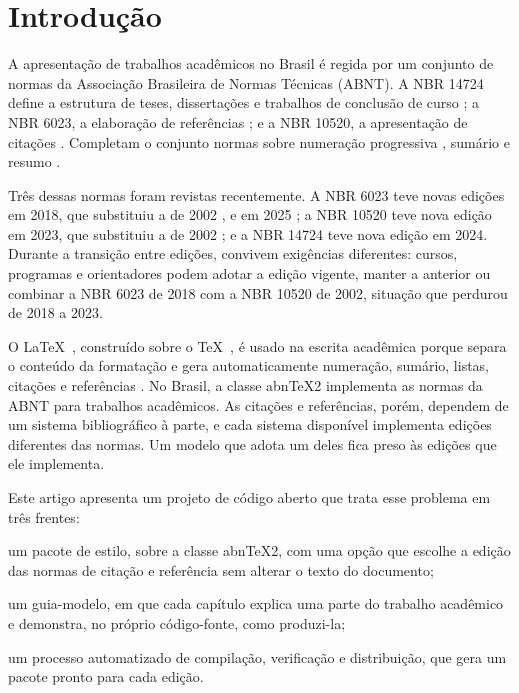 \documentclass[
	article,
	12pt,
	oneside,
	a4paper,
	english,
	brazil,
]{abntex2}
\begin{document}
\frenchspacing
\maketitle

\textual

\section{Introdução}\label{sec:introducao}

A apresentação de trabalhos acadêmicos no Brasil é regida por um conjunto de normas da Associação Brasileira de Normas Técnicas (ABNT). A NBR 14724 define a estrutura de teses, dissertações e trabalhos de conclusão de curso \cite{abnt14724}; a NBR 6023, a elaboração de referências \cite{abnt6023}; e a NBR 10520, a apresentação de citações \cite{abnt10520}. Completam o conjunto normas sobre numeração progressiva \cite{abnt6024}, sumário \cite{abnt6027} e resumo \cite{abnt6028}.

Três dessas normas foram revistas recentemente. A NBR 6023 teve novas edições em 2018, que substituiu a de 2002 \cite{abnt6023-2002}, e em 2025 \cite{abnt6023-2025}; a NBR 10520 teve nova edição em 2023, que substituiu a de 2002 \cite{abnt10520-2002}; e a NBR 14724 teve nova edição em 2024. Durante a transição entre edições, convivem exigências diferentes: cursos, programas e orientadores podem adotar a edição vigente, manter a anterior ou combinar a NBR 6023 de 2018 com a NBR 10520 de 2002, situação que perdurou de 2018 a 2023.

O \LaTeX\ \cite{lamport1994}, construído sobre o \TeX\ \cite{knuth1984texbook}, é usado na escrita acadêmica porque separa o conteúdo da formatação e gera automaticamente numeração, sumário, listas, citações e referências \cite{mittelbach2004}. No Brasil, a classe abn\TeX2 \cite{abntex2classe,ctan-abntex2} implementa as normas da ABNT para trabalhos acadêmicos. As citações e referências, porém, dependem de um sistema bibliográfico à parte, e cada sistema disponível implementa edições diferentes das normas. Um modelo que adota um deles fica preso às edições que ele implementa.

Este artigo apresenta um projeto de código aberto \cite{modeloufv} que trata esse problema em três frentes:

\begin{alineas}
	\item um pacote de estilo, sobre a classe abn\TeX2, com uma opção que escolhe a edição das normas de citação e referência sem alterar o texto do documento;
	\item um guia-modelo, em que cada capítulo explica uma parte do trabalho acadêmico e demonstra, no próprio código-fonte, como produzi-la;
	\item um processo automatizado de compilação, verificação e distribuição, que gera um pacote pronto para cada edição.
\end{alineas}
\end{document}
